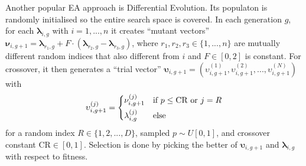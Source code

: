 \documentclass[twoside,11pt]{article}
\begin{document}
Another popular EA approach is Differential Evolution. Its populaton is randomly initialised so the entire search space is covered.
In each generation $g$, for each $\boldsymbol\lambda_{i,g}$ with $i=1,...,n$ it creates ``mutant vectors''
$\boldsymbol\nu_{i,g+1}=\boldsymbol\lambda_{r_1,g}+F\cdot(\boldsymbol\lambda_{r_2,g}-\boldsymbol\lambda_{r_3,g})$,
where $r_1,r_2,r_3\in\{1,...,n\}$ are mutually different random indices that also different from $i$ and $F\in[0,2]$ is constant.
For crossover, it then generates a ``trial vector'' $\boldsymbol\upsilon_{i,g+1}=(\upsilon_{i,g+1}^{(1)},\upsilon_{i,g+1}^{(2)},...,\upsilon_{i,g+1}^{(N)})$ with
\begin{equation}
  \upsilon_{i,g+1}^{(j)} = \begin{dcases}
    \nu_{i,g+1}^{(j)} & \text{if } p\le\text{CR}\text{ or } j=R \\
    \lambda_{i,g}^{(j)} & \text{else}
  \end{dcases}
\end{equation}
for a random index $R\in\{1,2,...,D\}$, sampled $p\sim U[0,1]$, and crossover constant $\text{CR}\in[0,1]$.
Selection is done by picking the better of $\boldsymbol\upsilon_{i,g+1}$ and $\boldsymbol\lambda_{i,g}$ with respect to fitness. \citep[p. 343]{differential_evolution}
\end{document}
